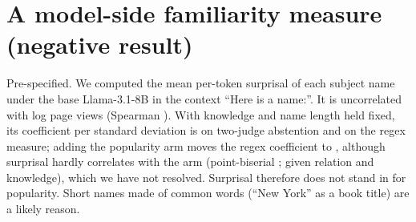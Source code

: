 \documentclass{article}
\begin{document}
\section{A model-side familiarity measure (negative result)}
\label{app:surprisal}

Pre-specified. We computed the mean per-token surprisal of each subject name under the base Llama-3.1-8B in the context ``Here is a name:''. It is uncorrelated with log page views (Spearman \esRho). With knowledge and name length held fixed, its coefficient per standard deviation is \esJudge{} \esJudgeCI{} on two-judge abstention and \esRegex{} \esRegexCI{} on the regex measure; adding the popularity arm moves the regex coefficient to \esRegexPop{} \esRegexPopCI, although surprisal hardly correlates with the arm (point-biserial \esArmR; \esArmPartial{} given relation and knowledge), which we have not resolved. Surprisal therefore does not stand in for popularity. Short names made of common words (``New York'' as a book title) are a likely reason.
\end{document}
